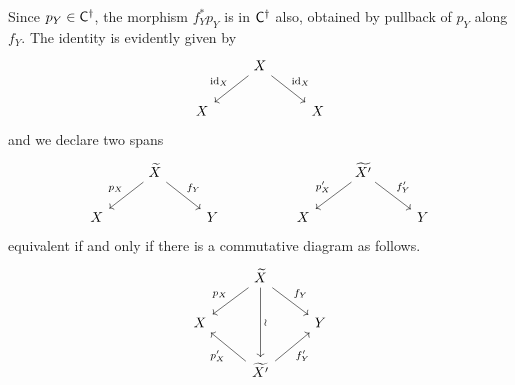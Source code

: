 \begin{remark}
	Since $p_{Y}\in\mathsf{C}^{\dagger}$, the morphism $f^{*}_{Y}p_{Y}$ is in $\mathsf{C}^{\dagger}$ also, obtained by pullback of $p_{Y}$ along $f_{Y}$. The identity is evidently given by 
	$$%
	\begin{tikzcd}
		& X \\
		X && X
		\arrow["{\id_{X}}"', from=1-2, to=2-1]
		\arrow["{\id_{X}}", from=1-2, to=2-3]
	\end{tikzcd}$$
	and we declare two spans 
	$$%
	\begin{tikzcd}
		& {\widetilde{X}} &&&& {\widetilde{X'}} \\
		X && Y && X && Y
		\arrow["{p_{X}}"', from=1-2, to=2-1]
		\arrow["{f_{Y}}", from=1-2, to=2-3]
		\arrow["{p'_{X}}"', from=1-6, to=2-5]
		\arrow["{f'_{Y}}", from=1-6, to=2-7]
	\end{tikzcd}$$
	equivalent if and only if there is a commutative diagram as follows. 
	$$%
	\begin{tikzcd}
		& {\widetilde{X}} \\
		X && Y \\
		& {\widetilde{X'}}
		\arrow["{f_{Y}}", from=1-2, to=2-3]
		\arrow["{p_{X}}"', from=1-2, to=2-1]
		\arrow["{p'_{X}}", from=3-2, to=2-1]
		\arrow["{f'_{Y}}"', from=3-2, to=2-3]
		\arrow["\wr", from=1-2, to=3-2]
	\end{tikzcd}$$
\end{remark}
